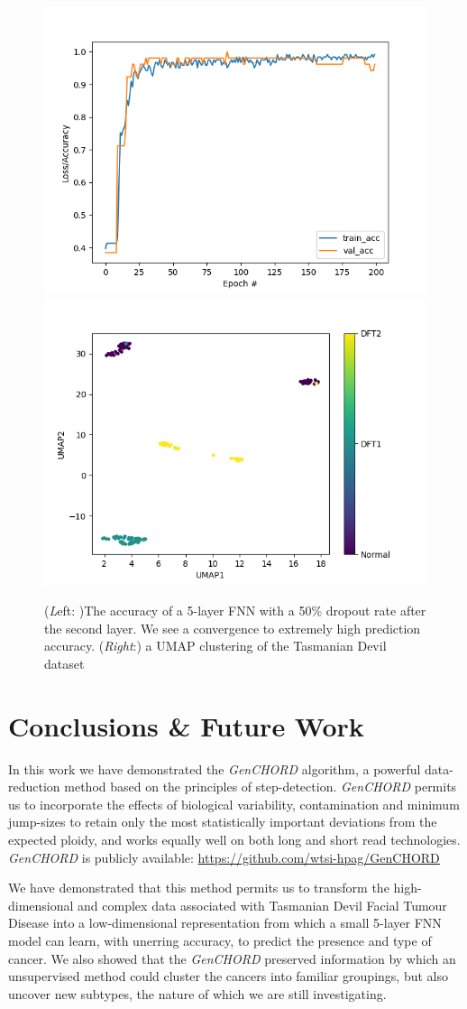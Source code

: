 \documentclass[fleqn,usenatbib]{acmart}
\def\codename{\textit{GenCHORD}}
\begin{document}
{				\begin{figure}
					\includegraphics[width=0.55\linewidth]{Figures/Classifier.png}\includegraphics[width=0.55\linewidth]{Figures/UMAP.png}
					\caption{(\textit Left: )The accuracy of a 5-layer FNN with a 50\% dropout rate after the second layer. We see a convergence to extremely high prediction accuracy. (\textit{Right}:) a UMAP clustering of the Tasmanian Devil dataset}\label{F:Classifier}
				\end{figure}

			}
			\section{Conclusions \& Future Work}
					
					In this work we have demonstrated the \textit{\codename{}} algorithm, a powerful data-reduction method based on the principles of step-detection. \codename{} permits us to incorporate the effects of biological variability, contamination and minimum jump-sizes to retain only the most statistically important deviations from the expected ploidy, and works equally well on both long and short read technologies.  \codename{} is publicly available: \url{https://github.com/wtsi-hpag/GenCHORD}

					We have demonstrated that this method permits us to transform the high-dimensional and complex data associated with Tasmanian Devil Facial Tumour Disease into a low-dimensional representation from which a small 5-layer FNN model can learn, with unerring accuracy, to predict the presence and type of cancer. We also showed that the \codename{} preserved information by which an unsupervised method could cluster the cancers into familiar groupings, but also uncover new subtypes, the nature of which we are still investigating. 
					
\end{document}
